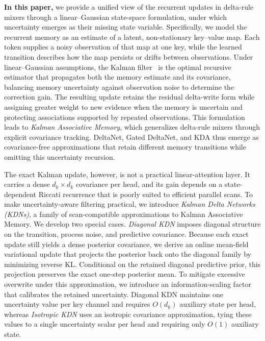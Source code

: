 \documentclass[11pt,letterpaper,logo]{yalearxiv}
\begin{document}
\textbf{In this paper,} we provide a unified view of the recurrent updates in delta-rule mixers through a
linear--Gaussian state-space formulation, under which uncertainty emerges as their missing state
variable. Specifically, we model the recurrent memory as an estimate of a latent, non-stationary
key--value map. Each token supplies a noisy observation of that map at one key, while the learned
transition describes how the map persists or drifts between observations. Under linear--Gaussian
assumptions, the Kalman filter~\citep{kalman1960new} is the optimal recursive estimator that
propagates both the memory estimate and its covariance, balancing memory uncertainty against
observation noise to determine the correction gain. The resulting update retains the 
residual delta-write form while assigning greater
weight to new evidence when the memory is uncertain and protecting associations supported by
repeated observations. This formulation leads to \emph{Kalman Associative Memory}, which
generalizes delta-rule mixers through explicit covariance tracking. DeltaNet, Gated DeltaNet, and
KDA thus emerge as covariance-free approximations that retain different memory transitions while omitting this uncertainty recursion.

The exact Kalman update, however, is not a practical linear-attention layer. It
carries a dense $d_k\times d_k$ covariance per head, and its gain depends on a state-dependent
Riccati recurrence that is poorly suited to efficient parallel scans. To make uncertainty-aware
filtering practical, we introduce \emph{Kalman Delta Networks (KDNs)}, a family of scan-compatible
approximations to Kalman Associative Memory. We develop two special cases. \emph{Diagonal KDN}
imposes diagonal structure on the transition, process noise, and predictive covariance. Because
each exact update still yields a dense posterior covariance, we derive an online mean-field
variational update that projects the posterior back onto the diagonal family by minimizing reverse
KL. Conditional on the retained diagonal predictive prior, this projection preserves the exact
one-step posterior mean. To mitigate excessive overwrite under this approximation, we introduce an
information-scaling factor that calibrates the retained uncertainty. Diagonal KDN maintains one
uncertainty value per key channel and requires $O(d_k)$ auxiliary state per head, whereas
\emph{Isotropic KDN} uses an isotropic covariance approximation, tying these values to a single
uncertainty scalar per head and requiring only $O(1)$ auxiliary state.
\end{document}
